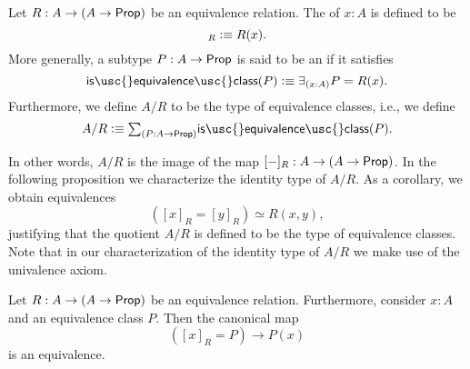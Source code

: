 \begin{defn}
  Let $R:A\to (A\to\mathsf{Prop})$ be an equivalence relation. The  of $x:A$ is defined to be
  \begin{equation*}
    [x]_R\defeq R(x).
  \end{equation*}
  More generally, a subtype $P:A\to \mathsf{Prop}$ is said to be an  if it satisfies
  \begin{equation*}
    \mathsf{is\usc{}equivalence\usc{}class}(P)\defeq\exists_{(x:A)}P=R(x).
  \end{equation*}
  Furthermore, we define $A/R$ to be the type of equivalence classes, i.e., we define
  \begin{equation*}
    A/R\defeq \sm{P:A\to\prop}\mathsf{is\usc{}equivalence\usc{}class}(P).
  \end{equation*}
\end{defn}

In other words, $A/R$ is the image of the map $[{-}]_R:A\to (A\to\mathsf{Prop})$. In the following proposition we characterize the identity type of $A/R$. As a corollary, we obtain equivalences
\begin{equation*}
  ([x]_R=[y]_R)\simeq R(x,y),
\end{equation*}
justifying that the quotient $A/R$ is defined to be the type of equivalence classes. Note that in our characterization of the identity type of $A/R$ we make use of the univalence axiom.

\begin{prp}\label{prp:eq-quotient}
  Let $R:A\to (A\to\mathsf{Prop})$ be an equivalence relation. Furthermore, consider $x:A$ and an equivalence class $P$. Then the canonical map
  \begin{equation*}
    ([x]_R=P)\to P(x)
  \end{equation*}
  is an equivalence.
\end{prp}

